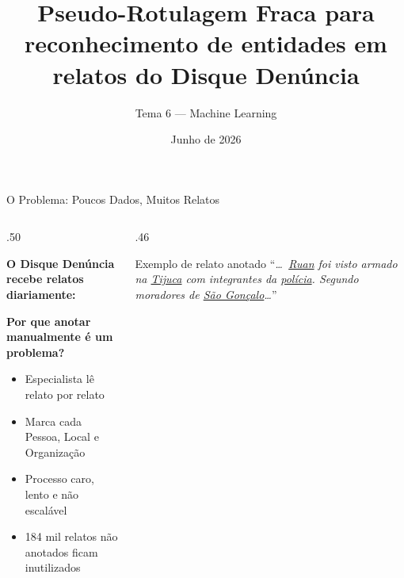 \documentclass[aspectratio=169, 9pt]{beamer}
\title{Pseudo-Rotulagem Fraca para reconhecimento de entidades em relatos do Disque Denúncia}
\subtitle{Tema 6 --- Machine Learning}
\author{}
\date{Junho de 2026}
\begin{document}
\maketitle

\begin{frame}{O Problema: Poucos Dados, Muitos Relatos}

  \begin{columns}[T]
    \begin{column}{.50\textwidth}

      \textbf{O Disque Denúncia recebe relatos diariamente:}\\[6pt]


      \vspace{10pt}
      \textbf{Por que anotar manualmente é um problema?}
      \begin{itemize}
        \item Especialista lê relato por relato
        \item Marca cada Pessoa, Local e Organização
        \item Processo \alert{caro}, \alert{lento} e \alert{não escalável}
        \item 184 mil relatos não anotados ficam inutilizados
      \end{itemize}
    \end{column}

    \begin{column}{.46\textwidth}
      \begin{exampleblock}{Exemplo de relato anotado}
        \footnotesize
        ``\textit{\ldots\,%
        \textcolor{azul!80!black}{\underline{Ruan}}
        foi visto armado na
        \textcolor{verde!70!black}{\underline{Tijuca}}
        com integrantes da
        \textcolor{amarelo!80!black}{\underline{polícia}}.
        Segundo moradores de
        \textcolor{verde!70!black}{\underline{São Gonçalo}}\ldots}''
      \end{exampleblock}


\end{column}
\end{columns}
\end{frame}
\end{document}
